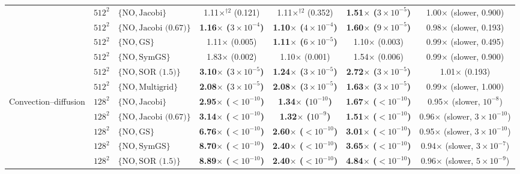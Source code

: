 {\begin{tabular}{lllcccc}
 & $512^2$ & $\{\mathrm{NO}, \text{Jacobi}\}$ & 1.11$\times$$^{\dagger 2}$ (0.121) & 1.11$\times$$^{\dagger 2}$ (0.352) & \textbf{1.51$\times$ ($3\times10^{-5}$)} & 1.00$\times$ (slower, 0.900) \\
 & $512^2$ & $\{\mathrm{NO}, \text{Jacobi (0.67)}\}$ & \textbf{1.16$\times$ ($3\times10^{-4}$)} & \textbf{1.10$\times$ ($4\times10^{-4}$)} & \textbf{1.60$\times$ ($9\times10^{-5}$)} & 0.98$\times$ (slower, 0.193) \\
 & $512^2$ & $\{\mathrm{NO}, \text{GS}\}$ & 1.11$\times$ (0.005) & \textbf{1.11$\times$ ($6\times10^{-5}$)} & 1.10$\times$ (0.003) & 0.99$\times$ (slower, 0.495) \\
 & $512^2$ & $\{\mathrm{NO}, \text{SymGS}\}$ & 1.83$\times$ (0.002) & 1.10$\times$ (0.001) & 1.54$\times$ (0.006) & 0.99$\times$ (slower, 0.900) \\
 & $512^2$ & $\{\mathrm{NO}, \text{SOR (1.5)}\}$ & \textbf{3.10$\times$ ($3\times10^{-5}$)} & \textbf{1.24$\times$ ($3\times10^{-5}$)} & \textbf{2.72$\times$ ($3\times10^{-5}$)} & 1.01$\times$ (0.193) \\
 & $512^2$ & $\{\mathrm{NO}, \text{Multigrid}\}$ & \textbf{2.08$\times$ ($3\times10^{-5}$)} & \textbf{2.08$\times$ ($3\times10^{-5}$)} & \textbf{1.63$\times$ ($3\times10^{-5}$)} & 0.99$\times$ (slower, 1.000) \\
\midrule
Convection--diffusion & $128^2$ & $\{\mathrm{NO}, \text{Jacobi}\}$ & \textbf{2.95$\times$ ($<10^{-10}$)} & \textbf{1.34$\times$ ($10^{-10}$)} & \textbf{1.67$\times$ ($<10^{-10}$)} & 0.95$\times$ (slower, $10^{-8}$) \\
 & $128^2$ & $\{\mathrm{NO}, \text{Jacobi (0.67)}\}$ & \textbf{3.14$\times$ ($<10^{-10}$)} & \textbf{1.32$\times$ ($10^{-9}$)} & \textbf{1.51$\times$ ($<10^{-10}$)} & 0.96$\times$ (slower, $3\times10^{-10}$) \\
 & $128^2$ & $\{\mathrm{NO}, \text{GS}\}$ & \textbf{6.76$\times$ ($<10^{-10}$)} & \textbf{2.60$\times$ ($<10^{-10}$)} & \textbf{3.01$\times$ ($<10^{-10}$)} & 0.95$\times$ (slower, $3\times10^{-10}$) \\
 & $128^2$ & $\{\mathrm{NO}, \text{SymGS}\}$ & \textbf{8.70$\times$ ($<10^{-10}$)} & \textbf{2.40$\times$ ($<10^{-10}$)} & \textbf{3.65$\times$ ($<10^{-10}$)} & 0.94$\times$ (slower, $3\times10^{-7}$) \\
 & $128^2$ & $\{\mathrm{NO}, \text{SOR (1.5)}\}$ & \textbf{8.89$\times$ ($<10^{-10}$)} & \textbf{2.40$\times$ ($<10^{-10}$)} & \textbf{4.84$\times$ ($<10^{-10}$)} & 0.96$\times$ (slower, $5\times10^{-9}$) \\

\end{tabular}}
